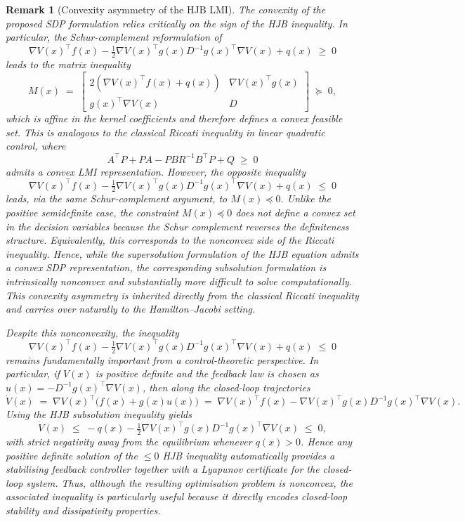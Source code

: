 \documentclass[11pt]{article}
\newtheorem{remark}[theorem]{Remark}
\begin{document}
\begin{remark}[Convexity asymmetry of the HJB LMI]
\label{rem:convexity_asymmetry}
The convexity of the proposed SDP formulation relies critically on the sign of the HJB inequality. In particular, the Schur-complement reformulation of
\[
\nabla V(x)^\top f(x) - \tfrac{1}{2}\nabla V(x)^\top g(x) D^{-1} g(x)^\top \nabla V(x) + q(x) \;\geq\; 0
\]
leads to the matrix inequality
\[
M(x) \;=\; \begin{bmatrix} 2\!\left(\nabla V(x)^\top f(x) + q(x)\right) & \nabla V(x)^\top g(x) \\ g(x)^\top \nabla V(x) & D \end{bmatrix} \;\succeq\; 0,
\]
which is affine in the kernel coefficients and therefore defines a convex feasible set. This is analogous to the classical Riccati inequality in linear quadratic control, where
\[
A^\top P + PA - PBR^{-1}B^\top P + Q \;\geq\; 0
\]
admits a convex LMI representation. However, the opposite inequality
\[
\nabla V(x)^\top f(x) - \tfrac{1}{2}\nabla V(x)^\top g(x) D^{-1} g(x)^\top \nabla V(x) + q(x) \;\leq\; 0
\]
leads, via the same Schur-complement argument, to $M(x) \preceq 0$. Unlike the positive semidefinite case, the constraint $M(x) \preceq 0$ does not define a convex set in the decision variables because the Schur complement reverses the definiteness structure. Equivalently, this corresponds to the nonconvex side of the Riccati inequality. Hence, while the supersolution formulation of the HJB equation admits a convex SDP representation, the corresponding subsolution formulation is intrinsically nonconvex and substantially more difficult to solve computationally. This convexity asymmetry is inherited directly from the classical Riccati inequality and carries over naturally to the Hamilton--Jacobi setting.

Despite this nonconvexity, the inequality
\[
\nabla V(x)^\top f(x) - \tfrac{1}{2}\nabla V(x)^\top g(x) D^{-1} g(x)^\top \nabla V(x) + q(x) \;\leq\; 0
\]
remains fundamentally important from a control-theoretic perspective. In particular, if $V(x)$ is positive definite and the feedback law is chosen as $u(x) = -D^{-1}g(x)^\top \nabla V(x)$, then along the closed-loop trajectories
\[
\dot V(x) \;=\; \nabla V(x)^\top\bigl(f(x)+g(x)u(x)\bigr) \;=\; \nabla V(x)^\top f(x) - \nabla V(x)^\top g(x) D^{-1} g(x)^\top \nabla V(x).
\]
Using the HJB subsolution inequality yields
\[
\dot V(x) \;\leq\; -q(x) - \tfrac{1}{2}\nabla V(x)^\top g(x) D^{-1} g(x)^\top \nabla V(x) \;\leq\; 0,
\]
with strict negativity away from the equilibrium whenever $q(x) > 0$. Hence any positive definite solution of the $\leq 0$ HJB inequality automatically provides a stabilising feedback controller together with a Lyapunov certificate for the closed-loop system. Thus, although the resulting optimisation problem is nonconvex, the associated inequality is particularly useful because it directly encodes closed-loop stability and dissipativity properties.
\end{remark}
\end{document}
